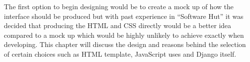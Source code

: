 \documentclass[../main.tex]{subfiles}
\begin{document}
\raggedright
The first option to begin designing would be to create a mock up of how the interface should be produced but with past experience in \enquote{Software Hut} it was decided that producing the HTML and CSS directly would be a better idea compared to a mock up which would be highly unlikely to achieve exactly when developing. This chapter will discuss the design and reasons behind the selection of certain choices such as HTML template, JavaScript uses and Django itself. 
\end{document}

